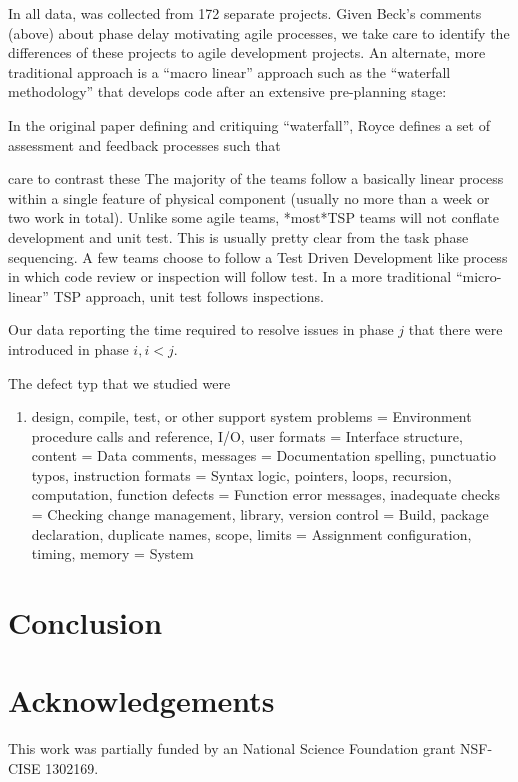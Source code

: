 \documentclass{sig-alternate}
\newcommand{\be}{\begin{enumerate}}
\newcommand{\ee}{\end{enumerate}}
\begin{document}
In all data, was collected from 172 separate projects. Given Beck's comments (above) about phase delay motivating agile processes, we take care to identify the differences of these 
projects to agile development projects. An alternate, more traditional approach is a ``macro linear''
approach such as the ``waterfall methodology'' that develops code after an extensive
pre-planning stage:
 

In the original paper defining and 
critiquing ``waterfall'', Royce defines a set of assessment and feedback processes
such that 


care to contrast these 
The majority of the teams follow a basically linear process within a single feature of physical component (usually no more than a week or two work in total). Unlike some agile teams, *most*TSP teams will not conflate development and unit test.  This is usually pretty clear from the task  phase sequencing. A few teams choose to follow a Test Driven Development like process in which code review or inspection will follow test. In a more traditional “micro-linear” TSP approach, unit test follows inspections. 


Our data reporting the time required
to resolve issues in phase $j$ that there were introduced in phase $i, i<j$.



The defect typ that we studied were
\be 
\item design, compile, test, or other support system problems = Environment
procedure calls and reference, I/O, user formats = Interface
structure, content = Data
comments, messages = Documentation
spelling, punctuatio typos, instruction formats = Syntax
logic, pointers, loops, recursion, computation, function defects = Function
error messages, inadequate checks = Checking
change management, library, version control = Build, package
declaration, duplicate names, scope, limits = Assignment
configuration, timing, memory = System
\ee
\section{Conclusion}

\section*{Acknowledgements}
This work was partially funded by an National Science
Foundation grant NSF-CISE 1302169.

\clearpage
\vspace*{0.5mm}
\scriptsize

 
\end{document}
